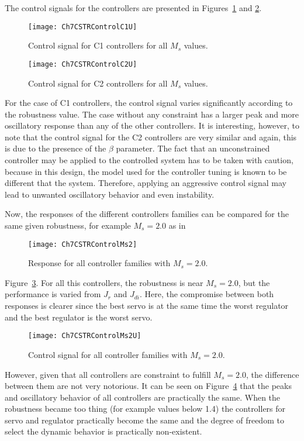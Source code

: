 The control signals for the controllers are presented in Figures~\ref{fig:Ch7CSTRControlC1U} and \ref{fig:Ch7CSTRControlC2U}. %
\begin{figure}[tb]
	\centering
	\texttt{[image: Ch7CSTRControlC1U]}
	\caption{Control signal for C1 controllers for all $M_s$ values.}
	\label{fig:Ch7CSTRControlC1U}
\end{figure}
%
\begin{figure}[tb]
	\centering
	\texttt{[image: Ch7CSTRControlC2U]}
	\caption{Control signal for C2 controllers for all $M_s$ values.}
	\label{fig:Ch7CSTRControlC2U}
\end{figure}
%
For the case of C1 controllers, the control signal varies significantly according to the robustness value. The case without any constraint has a larger peak and more oscillatory response than any of the other controllers. It is interesting, however, to note that the control signal for the C2 controllers are very similar and again, this is due to the presence of the $\beta$ parameter. The fact that an unconstrained controller may be applied to the controlled system has to be taken with caution, because in this design, the model used for the controller tuning is known to be different that the system. Therefore, applying an aggressive control signal may lead to unwanted oscillatory behavior and even instability.

Now, the responses of the different controllers families can be compared for the same given robustness, for example $M_s = 2.0$ as in %
\begin{figure}[tb]
	\centering
	\texttt{[image: Ch7CSTRControlMs2]}
	\caption{Response for all controller families with $M_s = 2.0$.}
	\label{fig:Ch7CSTRControlMs2}
\end{figure}
%
Figure~\ref{fig:Ch7CSTRControlMs2}. For all this controllers, the robustness is near $M_s = 2.0$, but the performance is varied from $J_r$ and $J_{di}$. Here, the compromise between both responses is clearer since the best servo is at the same time the worst regulator and the best regulator is the worst servo.
%
\begin{figure}[tb]
	\centering
	\texttt{[image: Ch7CSTRControlMs2U]}
	\caption{Control signal for all controller families with $M_s = 2.0$.}
	\label{fig:Ch7CSTRControlMs2U}
\end{figure}
%

However, given that all controllers are constraint to fulfill $M_s = 2.0$, the difference between them are not very notorious. It can be seen on Figure~\ref{fig:Ch7CSTRControlMs2U} that the peaks and oscillatory behavior of all controllers are practically the same. When the robustness became too thing (for example values below 1.4) the controllers for servo and regulator practically become the same and the degree of freedom to select the dynamic behavior is practically non-existent.


